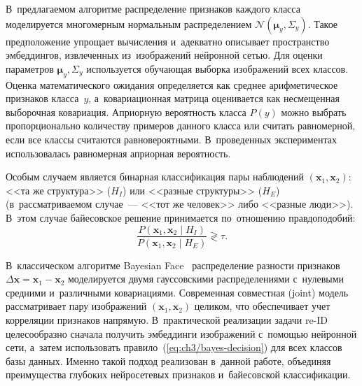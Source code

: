 В~предлагаемом алгоритме распределение признаков каждого класса
моделируется многомерным нормальным
распределением $\mathcal{N}(\boldsymbol{\mu}_y,\Sigma_y)$. Такое
предположение упрощает вычисления и~адекватно описывает пространство
эмбеддингов, извлеченных из~изображений нейронной сетью. Для оценки
параметров $\boldsymbol{\mu}_y,\Sigma_y$ используется обучающая
выборка изображений всех классов. Оценка математического ожидания
определяется как среднее арифметическое признаков класса~$y$,
а~ковариационная матрица оценивается как несмещенная выборочная
ковариация. Априорную вероятность класса $P(y)$ можно выбрать
пропорционально количеству примеров данного класса или считать
равномерной, если все классы считаются равновероятными. В~проведенных
экспериментах использовалась равномерная априорная вероятность.

Особым случаем является бинарная классификация пары наблюдений
$(\mathbf{x}_1,\mathbf{x}_2)$: <<та же структура>> ($H_I$) или
<<разные структуры>> ($H_E$) (в~рассматриваемом случае~--- <<тот же
человек>> либо <<разные люди>>). В~этом случае байесовское решение
принимается по~отношению правдоподобий:
\begin{equation}\label{eq:ch3/lrt}
    \frac{P(\mathbf{x}_1,\mathbf{x}_2\mid H_I)}{P(\mathbf{x}_1,\mathbf{x}_2\mid H_E)}\gtrless\tau.
\end{equation}

В~классическом алгоритме Bayesian Face~\cite{Moghaddam2000bayesface}
распределение разности признаков $\Delta\mathbf{x}=\mathbf{x}_1-\mathbf{x}_2$
моделируется двумя гауссовскими распределениями с~нулевыми средними
и~различными ковариациями. Современная совместная (joint)
модель~\cite{Chen2012bayesface} рассматривает пару изображений
$(\mathbf{x}_1,\mathbf{x}_2)$ целиком, что обеспечивает учет
корреляции признаков напрямую. В~практической реализации задачи
re-ID целесообразно сначала получить эмбеддинги изображений
с~помощью нейронной сети, а~затем использовать
правило~(\ref{eq:ch3/bayes-decision}) для всех классов базы данных.
Именно такой подход реализован в~данной работе, объединяя
преимущества глубоких нейросетевых признаков и~байесовской
классификации.

